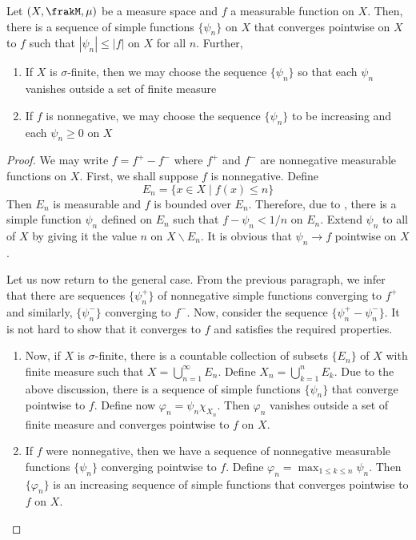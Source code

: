 \begin{theorem}
    Let $(X,\frakM,\mu)$ be a measure space and $f$ a measurable function on $X$. Then, there is a sequence of simple functions $\{\psi_n\}$ on $X$ that converges pointwise on $X$ to $f$ such that $|\psi_n|\le|f|$ on $X$ for all $n$. Further, 
    \begin{enumerate}[label=(\alph*)]
    \item If $X$ is $\sigma$-finite, then we may choose the sequence $\{\psi_n\}$ so that each $\psi_n$ vanishes outside a set of finite measure
    \item If $f$ is nonnegative, we may choose the sequence $\{\psi_n\}$ to be increasing and each $\psi_n\ge 0$ on $X$
    \end{enumerate}
\end{theorem}
\begin{proof}
    We may write $f = f^+ - f^-$ where $f^+$ and $f^-$ are nonnegative measurable functions on $X$. First, we shall suppose $f$ is nonnegative. Define 
    \begin{equation*}
        E_n = \{x\in X\mid f(x)\le n\}
    \end{equation*}
    Then $E_n$ is measurable and $f$ is bounded over $E_n$. Therefore, due to , there is a simple function $\psi_n$ defined on $E_n$ such that $f - \psi_n < 1/n$ on $E_n$. Extend $\psi_n$ to all of $X$ by giving it the value $n$ on $X\backslash E_n$. It is obvious that $\psi_n\to f$ pointwise on $X$.

    Let us now return to the general case. From the previous paragraph, we infer that there are sequences $\{\psi_n^+\}$ of nonnegative simple functions converging to $f^+$ and similarly, $\{\psi_n^-\}$ converging to $f^-$. Now, consider the sequence $\{\psi_n^+ - \psi_n^-\}$. It is not hard to show that it converges to $f$ and satisfies the required properties.

\begin{enumerate}
    \item Now, if $X$ is $\sigma$-finite, there is a countable collection of subsets $\{E_n\}$ of $X$ with finite measure such that $X = \bigcup\limits_{n = 1}^\infty E_n$. Define $X_n = \bigcup\limits_{k = 1}^n E_k$. Due to the above discussion, there is a sequence of simple functions $\{\psi_n\}$ that converge pointwise to $f$. Define now $\varphi_n = \psi_n\chi_{X_n}$. Then $\varphi_n$ vanishes outside a set of finite measure and converges pointwise to $f$ on $X$.

    \item If $f$ were nonnegative, then we have a sequence of nonnegative measurable functions $\{\psi_n\}$ converging pointwise to $f$. Define $\varphi_n = \max_{1\le k\le n}\psi_n$. Then $\{\varphi_n\}$ is an increasing sequence of simple functions that converges pointwise to $f$ on $X$.
\end{enumerate}
\end{proof}

